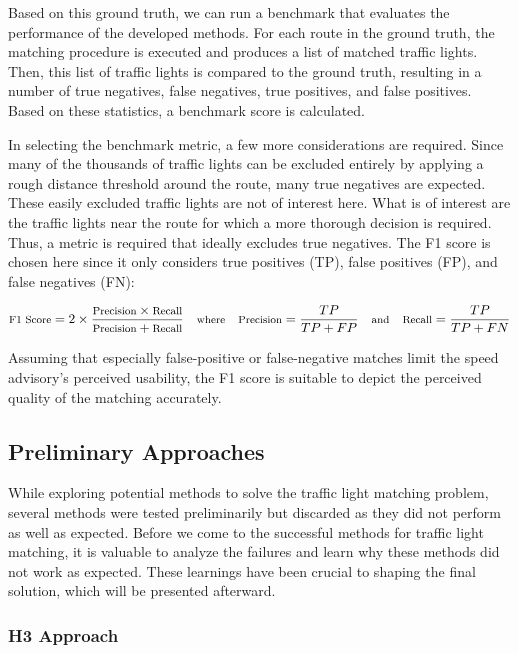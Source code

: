 Based on this ground truth, we can run a benchmark that evaluates the performance of the developed methods. For each route in the ground truth, the matching procedure is executed and produces a list of matched traffic lights. Then, this list of traffic lights is compared to the ground truth, resulting in a number of true negatives, false negatives, true positives, and false positives. Based on these statistics, a benchmark score is calculated.

In selecting the benchmark metric, a few more considerations are required. Since many of the thousands of traffic lights can be excluded entirely by applying a rough distance threshold around the route, many true negatives are expected. These easily excluded traffic lights are not of interest here. What is of interest are the traffic lights near the route for which a more thorough decision is required. Thus, a metric is required that ideally excludes true negatives. The F1 score is chosen here since it only considers true positives (TP), false positives (FP), and false negatives (FN): 

\begin{equation}
\text{\footnotesize F1 Score} = 2 \times \frac{\text{\footnotesize Precision} \times \text{\footnotesize Recall}}{\text{\footnotesize Precision} + \text{\footnotesize Recall}} \quad \text{\footnotesize where} \quad \text{\footnotesize Precision} = \frac{TP}{TP + FP} \quad \text{\footnotesize and} \quad \text{\footnotesize Recall} = \frac{TP}{TP + FN}
\end{equation}

Assuming that especially false-positive or false-negative matches limit the speed advisory's perceived usability, the F1 score is suitable to depict the perceived quality of the matching accurately.

\subsection{Preliminary Approaches}

While exploring potential methods to solve the traffic light matching problem, several methods were tested preliminarily but discarded as they did not perform as well as expected. Before we come to the successful methods for traffic light matching, it is valuable to analyze the failures and learn why these methods did not work as expected. These learnings have been crucial to shaping the final solution, which will be presented afterward.

\subsubsection{H3 Approach}

